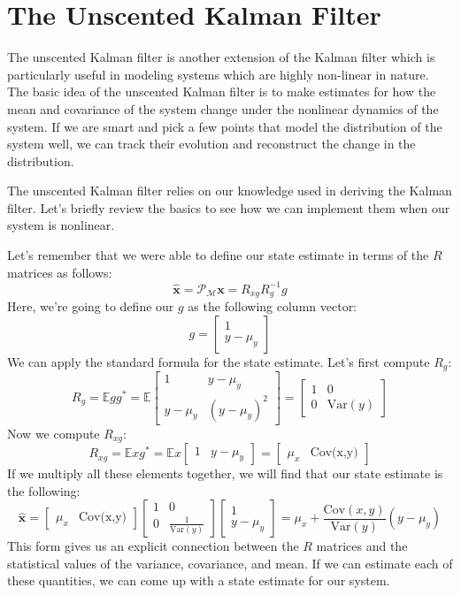 \section{The Unscented Kalman Filter}
The unscented Kalman filter is another extension of the Kalman filter which is particularly useful in modeling systems which are highly non-linear in nature. The basic idea of the unscented Kalman filter is to make estimates for how the mean and covariance of the system change under the nonlinear dynamics of the system. If we are smart and pick a few points that model the distribution of the system well, we can track their evolution and reconstruct the change in the distribution.

The unscented Kalman filter relies on our knowledge used in deriving the Kalman filter. Let's briefly review the basics to see how we can implement them when our system is nonlinear.

Let's remember that we were able to define our state estimate in terms of the $R$ matrices as follows:
$$\bm{\hat{x}}=\mathcal{P}_\mathcal{M}\bm{x}=R_{xg}R_g^{-1}g$$
Here, we're going to define our $g$ as the following column vector:
$$g=\begin{bmatrix}
    1\\y-\mu_y
\end{bmatrix}$$
We can apply the standard formula for the state estimate. Let's first compute $R_g$:
$$R_g=\mathbb{E}gg^*=\mathbb{E}\begin{bmatrix}
1&y-\mu_y\\y-\mu_y&(y-\mu_y)^2
\end{bmatrix}=\begin{bmatrix}
    1&0\\0&\mathrm{Var}(y)
\end{bmatrix}$$
Now we compute $R_{xg}$:
$$R_{xg}=\mathbb{E}xg^*=\mathbb{E}x\begin{bmatrix}
    1&y-\mu_y
\end{bmatrix}=\begin{bmatrix}
    \mu_x&\text{Cov(x,y)}
\end{bmatrix}$$
If we multiply all these elements together, we will find that our state estimate is the following:
$$\bm{\hat{x}}=\begin{bmatrix}
    \mu_x&\text{Cov(x,y)}
\end{bmatrix}\begin{bmatrix}
    1&0\\0& \frac{1}{\mathrm{Var}(y)}
\end{bmatrix}\begin{bmatrix}
    1\\y-\mu_y
\end{bmatrix}=\mu_x+\frac{\text{Cov}(x,y)}{\text{Var}(y)}(y-\mu_y)$$
This form gives us an explicit connection between the $R$ matrices and the statistical values of the variance, covariance, and mean. If we can estimate each of these quantities, we can come up with a state estimate for our system.

